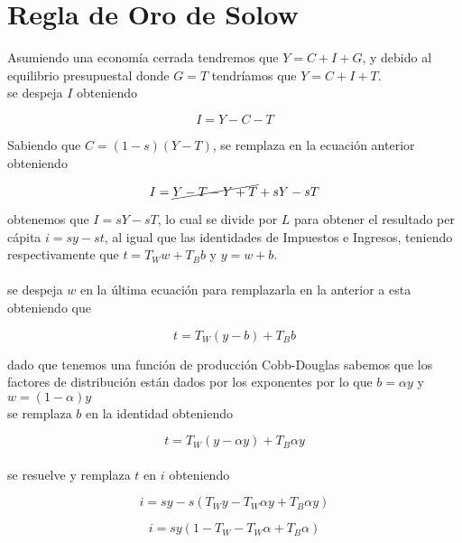 \documentclass[letter,12pt]{article}
\begin{document}
\section{Regla de Oro de Solow}
\begin{flushleft}

Asumiendo una economía cerrada tendremos que $Y=C+I+G$, y debido al equilibrio presupuestal donde $G=T$ tendríamos que $Y=C+I+T$.\\

se despeja $I$ obteniendo

\begin{equation*}
    I=Y-C-T
\end{equation*}

Sabiendo que $C=(1-s)(Y-T)$, se remplaza en la ecuación anterior obteniendo

\begin{equation*}
    I=\cancel{Y-T-Y+T}+sY-sT
\end{equation*}

obtenemos que $I =sY-sT$, lo cual se divide por $L$ para obtener el resultado per cápita $i=sy-st$, al igual que las identidades de Impuestos e Ingresos, teniendo respectivamente que $t=T_Ww+T_Bb$ y $y=w+b$.\\
~\\
se despeja $w$ en la última ecuación para remplazarla en la anterior a esta obteniendo que

\begin{equation*}
    t=T_W(y-b)+T_Bb
\end{equation*}

dado que tenemos una función de producción Cobb-Douglas sabemos que los factores de distribución están dados por los exponentes por lo que $b=\alpha y$ y $w = (1-\alpha)y$\\
se remplaza $b$ en la identidad obteniendo

\begin{equation*}
    t=T_W(y-\alpha y)+T_B\alpha y
\end{equation*}
~\\
se resuelve y remplaza $t$ en $i$ obteniendo

\begin{equation*}
    i=sy-s(T_Wy-T_W\alpha y+T_B\alpha y)
\end{equation*}

\begin{equation*}
    i=sy(1-T_W-T_W\alpha +T_B\alpha)
\end{equation*}
~\\


\end{flushleft}
\end{document}
